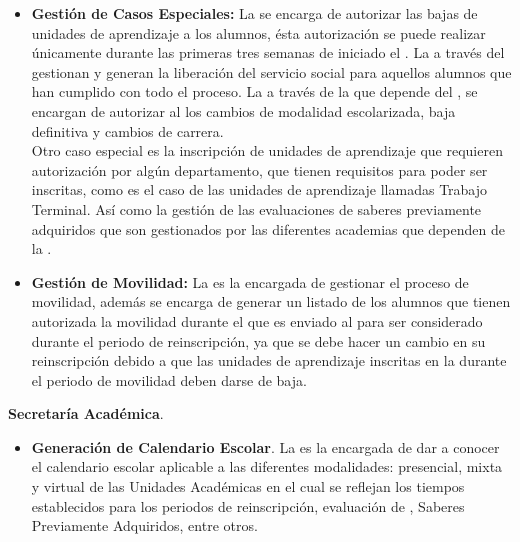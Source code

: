 \begin{ADescripcion}
\begin{itemize}
	\item \textbf{Gestión de Casos Especiales:} La  se encarga de autorizar las bajas de unidades de aprendizaje a los alumnos, ésta autorización se puede realizar únicamente durante las primeras tres semanas de iniciado el . La  a través del  gestionan y generan la liberación del servicio social para aquellos alumnos que han cumplido con todo el proceso. La  a través de la  que depende del , se encargan de autorizar al  los cambios de modalidad escolarizada, baja definitiva y cambios de carrera.\\
	
	 Otro caso especial es la inscripción de unidades de aprendizaje que requieren autorización por algún departamento, que tienen requisitos para poder ser inscritas, como es el caso de las unidades de aprendizaje llamadas Trabajo Terminal. Así como la gestión de las evaluaciones de saberes previamente adquiridos que son gestionados por las diferentes academias que dependen de la .\\
	
	
	\item \textbf{Gestión de Movilidad:} La  es la encargada de gestionar el proceso de movilidad, además se encarga de generar un listado de los alumnos que tienen autorizada la movilidad durante el  que es enviado al  para ser considerado durante el periodo de reinscripción, ya que  se debe hacer un cambio en su reinscripción debido a que las unidades de aprendizaje inscritas en la  durante el periodo de movilidad deben darse de baja.\\
	

	\end{itemize}

	\item \textbf{Secretaría Académica}.

	\begin{itemize}

	
	\item \textbf{Generación de Calendario Escolar}. La  es la encargada de dar a conocer el calendario escolar aplicable a las diferentes modalidades: presencial, mixta y virtual de las Unidades Académicas en el cual se reflejan los tiempos establecidos para los periodos de reinscripción, evaluación de , Saberes Previamente Adquiridos, entre otros.\\
	

\end{itemize}
\end{ADescripcion}
